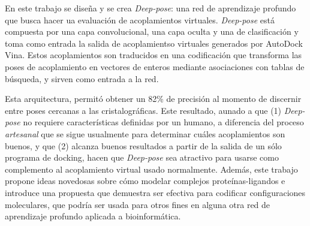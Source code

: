 En este trabajo se diseña y se crea \textit{Deep-pose}: una red de
aprendizaje profundo que busca hacer ua evaluación de acoplamientos
virtuales. \textit{Deep-pose} está compuesta por una capa
convolucional, una capa oculta y una de clasificación y toma como
entrada la salida de acoplamientso virtuales generados por AutoDock
Vina. Estos acoplamientos son traducidos en una codificación que
transforma las poses de acoplamiento en vectores de enteros mediante
asociaciones con tablas de búsqueda, y sirven como entrada a la red.

Esta arquitectura, permitó obtener un 82\% de precisión al momento de
discernir entre poses cercanas a las cristalográficas. Este resultado,
aunado a que (1) \textit{Deep-pose} no requiere características
definidas por un humano, a diferencia del proceso \textit{artesanal}
que se sigue usualmente para determinar cuáles acoplamientos son
buenos, y que (2) alcanza buenos resultados a partir de la salida de
un sólo programa de docking, hacen que \textit{Deep-pose} sea
atractivo para usarse como complemento al acoplamiento virtual usado
normalmente. Además, este trabajo propone ideas novedosas sobre cómo
modelar complejos proteínas-ligandos e introduce una propuesta que
demuestra ser efectiva para codificar configuraciones moleculares, que
podría ser usada para otros fines en alguna otra red de aprendizaje
profundo aplicada a bioinformática.
